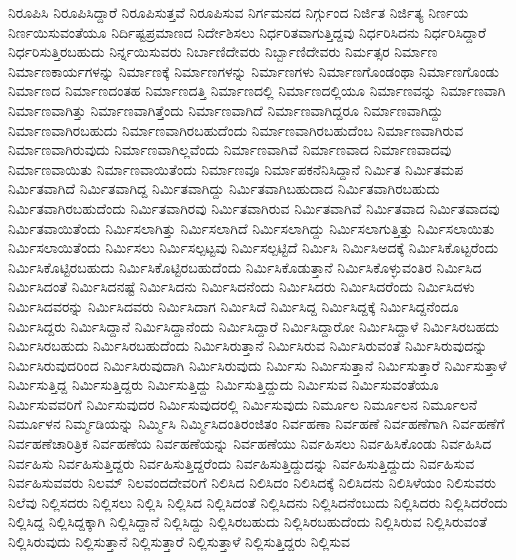 {ನಿರೂಪಿಸಿ
ನಿರೂಪಿಸಿದ್ದಾರೆ
ನಿರೂಪಿಸುತ್ತವೆ
ನಿರೂಪಿಸುವ
ನಿರ್ಗಮನದ
ನಿರ್ಗ್ಗುಂದ
ನಿರ್ಜಿತ
ನಿರ್ಜಿತ್ಯ
ನಿರ್ಣಯ
ನಿರ್ಣಯಿಸುವಂತೆಯೂ
ನಿರ್ದಿಷ್ಟಪ್ರಮಾಣದ
ನಿರ್ದೇಶಿಸಲು
ನಿರ್ಧರಿತವಾಗುತ್ತಿದ್ದವು
ನಿರ್ಧರಿಸಿದನು
ನಿರ್ಧರಿಸಿದ್ದಾರೆ
ನಿರ್ಧರಿಸುತ್ತಿರಬಹುದು
ನಿರ್ನ್ನಯಿಸುವರು
ನಿರ್ಬಾಣಿದೇವರು
ನಿರ್ಬ್ಬಾಣಿದೇವರು
ನಿರ್ಮತ್ಸರ
ನಿರ್ಮಾಣ
ನಿರ್ಮಾಣಕಾರ್ಯಗಳನ್ನು
ನಿರ್ಮಾಣಕ್ಕೆ
ನಿರ್ಮಾಣಗಳನ್ನು
ನಿರ್ಮಾಣಗಳು
ನಿರ್ಮಾಣಗೊಂಡಂಥಾ
ನಿರ್ಮಾಣಗೊಂಡು
ನಿರ್ಮಾಣದ
ನಿರ್ಮಾಣದಂತಹ
ನಿರ್ಮಾಣದತ್ತಿ
ನಿರ್ಮಾಣದಲ್ಲಿ
ನಿರ್ಮಾಣದಲ್ಲಿಯೂ
ನಿರ್ಮಾಣವನ್ನು
ನಿರ್ಮಾಣವಾಗಿ
ನಿರ್ಮಾಣವಾಗಿತ್ತು
ನಿರ್ಮಾಣವಾಗಿತ್ತೆಂದು
ನಿರ್ಮಾಣವಾಗಿದೆ
ನಿರ್ಮಾಣವಾಗಿದ್ದರೂ
ನಿರ್ಮಾಣವಾಗಿದ್ದು
ನಿರ್ಮಾಣವಾಗಿರಬಹುದು
ನಿರ್ಮಾಣವಾಗಿರಬಹುದೆಂದು
ನಿರ್ಮಾಣವಾಗಿರಬಹುದೆಂಬ
ನಿರ್ಮಾಣವಾಗಿರುವ
ನಿರ್ಮಾಣವಾಗಿರುವುದು
ನಿರ್ಮಾಣವಾಗಿಲ್ಲವೆಂದು
ನಿರ್ಮಾಣವಾಗಿವೆ
ನಿರ್ಮಾಣವಾದ
ನಿರ್ಮಾಣವಾದವು
ನಿರ್ಮಾಣವಾಯಿತು
ನಿರ್ಮಾಣವಾಯಿತೆಂದು
ನಿರ್ಮಾಣವೂ
ನಿರ್ಮಾಪಕನೆನಿಸಿದ್ದಾನೆ
ನಿರ್ಮಿತ
ನಿರ್ಮಿತಮಪ
ನಿರ್ಮಿತವಾಗಿದೆ
ನಿರ್ಮಿತವಾಗಿದ್ದ
ನಿರ್ಮಿತವಾಗಿದ್ದು
ನಿರ್ಮಿತವಾಗಿಬಹುದಾದ
ನಿರ್ಮಿತವಾಗಿರಬಹುದು
ನಿರ್ಮಿತವಾಗಿರಬಹುದೆಂದು
ನಿರ್ಮಿತವಾಗಿರವು
ನಿರ್ಮಿತವಾಗಿರುವ
ನಿರ್ಮಿತವಾಗಿವೆ
ನಿರ್ಮಿತವಾದ
ನಿರ್ಮಿತವಾದವು
ನಿರ್ಮಿತವಾಯಿತೆಂದು
ನಿರ್ಮಿಸಲಾಗಿತ್ತು
ನಿರ್ಮಿಸಲಾಗಿದೆ
ನಿರ್ಮಿಸಲಾಗಿದ್ದು
ನಿರ್ಮಿಸಲಾಗುತ್ತಿತ್ತು
ನಿರ್ಮಿಸಲಾಯಿತು
ನಿರ್ಮಿಸಲಾಯಿತೆಂದು
ನಿರ್ಮಿಸಲು
ನಿರ್ಮಿಸಲ್ಪಟ್ಟವು
ನಿರ್ಮಿಸಲ್ಪಟ್ಟಿದೆ
ನಿರ್ಮಿಸಿ
ನಿರ್ಮಿಸಿಅದಕ್ಕೆ
ನಿರ್ಮಿಸಿಕೊಟ್ಟರೆಂದು
ನಿರ್ಮಿಸಿಕೊಟ್ಟಿರಬಹುದು
ನಿರ್ಮಿಸಿಕೊಟ್ಟಿರಬಹುದೆಂದು
ನಿರ್ಮಿಸಿಕೊಡುತ್ತಾನೆ
ನಿರ್ಮಿಸಿಕೊಳ್ಳುವಂತಿರ
ನಿರ್ಮಿಸಿದ
ನಿರ್ಮಿಸಿದಂತೆ
ನಿರ್ಮಿಸಿದನಷ್ಟೆ
ನಿರ್ಮಿಸಿದನು
ನಿರ್ಮಿಸಿದನೆಂದು
ನಿರ್ಮಿಸಿದರು
ನಿರ್ಮಿಸಿದರೆಂದು
ನಿರ್ಮಿಸಿದಳು
ನಿರ್ಮಿಸಿದವರನ್ನು
ನಿರ್ಮಿಸಿದವರು
ನಿರ್ಮಿಸಿದಾಗ
ನಿರ್ಮಿಸಿದೆ
ನಿರ್ಮಿಸಿದ್ದ
ನಿರ್ಮಿಸಿದ್ದಕ್ಕೆ
ನಿರ್ಮಿಸಿದ್ದನೆಂದೂ
ನಿರ್ಮಿಸಿದ್ದರು
ನಿರ್ಮಿಸಿದ್ದಾನೆ
ನಿರ್ಮಿಸಿದ್ದಾನೆಂದು
ನಿರ್ಮಿಸಿದ್ದಾರೆ
ನಿರ್ಮಿಸಿದ್ದಾರೋ
ನಿರ್ಮಿಸಿದ್ದಾಳೆ
ನಿರ್ಮಿಸಿರಬಹದು
ನಿರ್ಮಿಸಿರಬಹುದು
ನಿರ್ಮಿಸಿರಬಹುದೆಂದು
ನಿರ್ಮಿಸಿರುತ್ತಾನೆ
ನಿರ್ಮಿಸಿರುವ
ನಿರ್ಮಿಸಿರುವಂತೆ
ನಿರ್ಮಿಸಿರುವುದನ್ನು
ನಿರ್ಮಿಸಿರುವುದರಿಂದ
ನಿರ್ಮಿಸಿರುವುದಾಗಿ
ನಿರ್ಮಿಸಿರುವುದು
ನಿರ್ಮಿಸು
ನಿರ್ಮಿಸುತ್ತಾನೆ
ನಿರ್ಮಿಸುತ್ತಾರೆ
ನಿರ್ಮಿಸುತ್ತಾಳೆ
ನಿರ್ಮಿಸುತ್ತಿದ್ದ
ನಿರ್ಮಿಸುತ್ತಿದ್ದರು
ನಿರ್ಮಿಸುತ್ತಿದ್ದು
ನಿರ್ಮಿಸುತ್ತಿದ್ದುದು
ನಿರ್ಮಿಸುವ
ನಿರ್ಮಿಸುವಂತೆಯೂ
ನಿರ್ಮಿಸುವವರಿಗೆ
ನಿರ್ಮಿಸುವುದರ
ನಿರ್ಮಿಸುವುದರಲ್ಲಿ
ನಿರ್ಮಿಸುವುದು
ನಿರ್ಮೂಲ
ನಿರ್ಮೂಲನ
ನಿರ್ಮೂಲನೆ
ನಿರ್ಮೂಳನ
ನಿರ್ಮ್ಮಡಿಯನ್ನು
ನಿರ್ಮ್ಮಿಸಿ
ನಿರ್ಮ್ಮಿಸಿದಂತಿರಂಜಿತಂ
ನಿರ್ವಹಣಾ
ನಿರ್ವಹಣೆ
ನಿರ್ವಹಣೆಗಾಗಿ
ನಿರ್ವಹಣೆಗೆ
ನಿರ್ವಹಣೆಚಾರಿತ್ರಿಕ
ನಿರ್ವಹಣೆಯ
ನಿರ್ವಹಣೆಯನ್ನು
ನಿರ್ವಹಣೆಯು
ನಿರ್ವಹಿಸಲು
ನಿರ್ವಹಿಸಿಕೊಂಡು
ನಿರ್ವಹಿಸಿದ
ನಿರ್ವಹಿಸು
ನಿರ್ವಹಿಸುತ್ತಿದ್ದರು
ನಿರ್ವಹಿಸುತ್ತಿದ್ದರೆಂದು
ನಿರ್ವಹಿಸುತ್ತಿದ್ದುದನ್ನು
ನಿರ್ವಹಿಸುತ್ತಿದ್ದುದು
ನಿರ್ವಹಿಸುವ
ನಿರ್ವಹಿಸುವವರು
ನಿಲಮ್
ನಿಲವಂದದೇವರಿಗೆ
ನಿಲಿಸಿದ
ನಿಲಿಸಿದಂ
ನಿಲಿಸಿದಕ್ಕೆ
ನಿಲಿಸಿದನು
ನಿಲಿಸಿಳೆಯಂ
ನಿಲಿಸುವರು
ನಿಲೆವು
ನಿಲ್ಲಿಸದರು
ನಿಲ್ಲಿಸಲು
ನಿಲ್ಲಿಸಿ
ನಿಲ್ಲಿಸಿದ
ನಿಲ್ಲಿಸಿದಂತೆ
ನಿಲ್ಲಿಸಿದನು
ನಿಲ್ಲಿಸಿದನೆಂಬುದು
ನಿಲ್ಲಿಸಿದರು
ನಿಲ್ಲಿಸಿದರೆಂದು
ನಿಲ್ಲಿಸಿದ್ದ
ನಿಲ್ಲಿಸಿದ್ದಕ್ಕಾಗಿ
ನಿಲ್ಲಿಸಿದ್ದಾನೆ
ನಿಲ್ಲಿಸಿದ್ದು
ನಿಲ್ಲಿಸಿರಬಹುದು
ನಿಲ್ಲಿಸಿರಬಹುದೆಂದು
ನಿಲ್ಲಿಸಿರುವ
ನಿಲ್ಲಿಸಿರುವಂತೆ
ನಿಲ್ಲಿಸಿರುವುದು
ನಿಲ್ಲಿಸುತ್ತಾನೆ
ನಿಲ್ಲಿಸುತ್ತಾರೆ
ನಿಲ್ಲಿಸುತ್ತಾಳೆ
ನಿಲ್ಲಿಸುತ್ತಿದ್ದರು
ನಿಲ್ಲಿಸುವ
}
